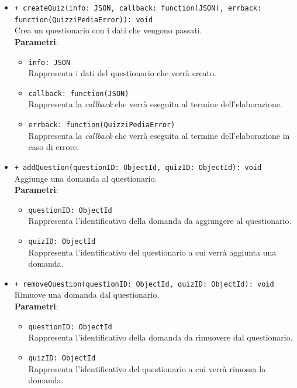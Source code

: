 \begin{itemize}
\begin{itemize}
			\item \texttt{+ createQuiz(info: JSON, callback: function(JSON), errback: function(QuizziPediaError)): void}\\
			Crea un questionario con i dati che vengono passati.\\
			\textbf{Parametri}:
			\begin{itemize}
				\item \texttt{info: JSON}\\
				Rappresenta i dati del questionario che verrà creato.
				\item \texttt{callback: function(JSON)}\\
				Rappresenta la \textit{callback} che verrà eseguita al termine dell'elaborazione.
				\item \texttt{errback: function(QuizziPediaError)}\\
				Rappresenta la \textit{callback} che verrà eseguita al termine dell'elaborazione in caso di errore.
			\end{itemize}
			
			\item \texttt{+ addQuestion(questionID: ObjectId, quizID: ObjectId): void}\\
			Aggiunge una domanda al questionario.\\
			\textbf{Parametri}:
			\begin{itemize}
				\item \texttt{questionID: ObjectId}\\
				Rappresenta l'identificativo della domanda da aggiungere al questionario.
				\item \texttt{quizID: ObjectId}\\
				Rappresenta l'identificativo del questionario a cui verrà aggiunta una domanda.
			\end{itemize}
			
			\item \texttt{+ removeQuestion(questionID: ObjectId, quizID: ObjectId): void}\\
			Rimuove una domanda dal questionario.\\
			\textbf{Parametri}:
			\begin{itemize}
				\item \texttt{questionID: ObjectId}\\
				Rappresenta l'identificativo della domanda da rimuovere dal questionario.
				\item \texttt{quizID: ObjectId}\\
				Rappresenta l'identificativo del questionario a cui verrà rimossa la domanda.
			\end{itemize}
			

\end{itemize}
\end{itemize}
